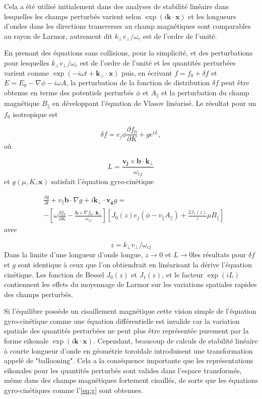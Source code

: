 \documentclass[main.tex]{subfiles}
\begin{document}
Cela a été utilisé initialement dans des analyses de stabilité linéaire dans lesquelles les champs perturbés varient selon \( \exp\left(i \bm{k}\cdot \bm{x}\right) \) et les longueurs d'ondes dans les directions transverses au champ magnétiques sont comparables au rayon de Larmor, autrement dit \( k_\perp v_\perp / \omega_c \) est de l'ordre de l'unité.

En prenant des équations sans collisions, pour la simplicité, et des perturbations pour lesquelles \( k_\perp v_\perp / \omega_c \) est de l'ordre de l'unité et les quantités perturbées varient comme \( \exp\left( - i \omega t + \bm{k_\perp} \cdot \bm{x} \right) \) puis, en écrivant \( f = f_0 + \delta f \) et \( E = E_0 - \nabla \phi - i \omega A \), la perturbation de la fonction de distribution \( \delta f \) peut être obtenue en terme des potentiels perturbés \( \phi \) et  \( A_\parallel \) et la perturbation du champ magnétique \( B_\parallel \) en développant l'équation de Vlasov linéarisé.
Le résultat pour un \( f_0 \) isotropique est

\[
	\delta f = e_j \phi \frac{\partial f_0}{\partial K} + g e^{iL},
\]
où

\[
	L = \frac{\bm{v_j} \times \bm{b} \cdot \bm{k_\perp}}{\omega_{cj}}
\]
et \( g\left( \mu, K, \bm{x} \right) \) satisfait l'équation gyro-cinétique

\begin{align}
& \frac{\partial g}{\partial t} + v_\parallel \bm{b} \cdot \nabla g + i \bm{k_\perp} \cdot \bm{v_g} g =\nonumber \\
& - \left[ \omega \frac{\partial f_0}{\partial K} - \frac{\bm{b} \times \nabla f_0 \cdot \bm{k_\perp}}{\omega_{cj}} \right] \left[ J_0 \left( z \right) e_j \left( \phi - v_\parallel A_\parallel\right) + \frac{2 J_1 \left( z \right)}{z} \mu B_\parallel \right]
\label{eq:g}
\end{align}
avec

\[
	z = k_\perp v_\perp / \omega_{cj}
\]
Dans la limite d'une longueur d'onde longue, \( z \rightarrow 0 \) et \( L \rightarrow 0 \)les résultats pour \( \delta f \) et \( g \) sont identique à ceux que l'on obtiendrait en linéarisant la dérive l'équation cinétique.
Les fonction de Bessel \( J_0\left(z\right) \) et \( J_1\left(z\right) \), et le facteur \( \exp\left(iL\right) \) contiennent les effets du moyennage de Larmor sur les variations spatiales rapides des champs perturbés.

Si l'équilibre possède un cisaillement magnétique  cette vision simple de l'équation gyro-cinétique comme une équation différentielle est invalide car la variation spatiale des quantités perturbées ne peut plus être représentée purement par la forme eikonale \( \exp\left( i \bm{k} \cdot \bm{x}\right) \).
Cependant, beaucoup de calculs de stabilité linéaire à courte longueur d'onde en géométrie toroïdale introduisent une transformation appelé de "ballooning".
Cela a la conséquence importante que les représentations eikonales pour les quantités perturbés sont valides dans l'espace transformés, même dans des champs magnétiques fortement cisaillés, de sorte que les équations gyro-cinétiques comme l'\autoref{eq:g} sont obtenues.
\end{document}
